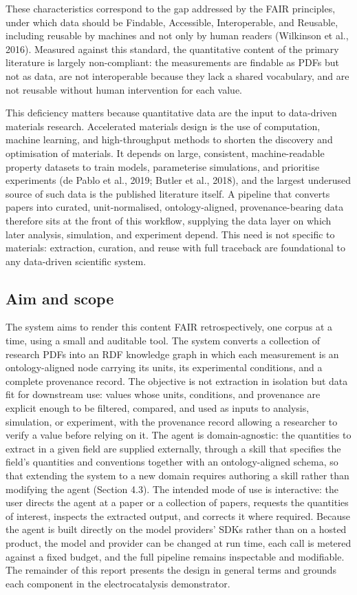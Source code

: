 \documentclass{template}
\begin{document}
These characteristics correspond to the gap addressed by the FAIR principles, under which data should be Findable, Accessible, Interoperable, and Reusable, including reusable by machines and not only by human readers (Wilkinson et al., 2016). Measured against this standard, the quantitative content of the primary literature is largely non-compliant: the measurements are findable as PDFs but not as data, are not interoperable because they lack a shared vocabulary, and are not reusable without human intervention for each value.

This deficiency matters because quantitative data are the input to data-driven materials research. Accelerated materials design is the use of computation, machine learning, and high-throughput methods to shorten the discovery and optimisation of materials. It depends on large, consistent, machine-readable property datasets to train models, parameterise simulations, and prioritise experiments (de Pablo et al., 2019; Butler et al., 2018), and the largest underused source of such data is the published literature itself. A pipeline that converts papers into curated, unit-normalised, ontology-aligned, provenance-bearing data therefore sits at the front of this workflow, supplying the data layer on which later analysis, simulation, and experiment depend. This need is not specific to materials: extraction, curation, and reuse with full traceback are foundational to any data-driven scientific system.

\subsection{Aim and scope}

The system aims to render this content FAIR retrospectively, one corpus at a time, using a small and auditable tool. The system converts a collection of research PDFs into an RDF knowledge graph in which each measurement is an ontology-aligned node carrying its units, its experimental conditions, and a complete provenance record. The objective is not extraction in isolation but data fit for downstream use: values whose units, conditions, and provenance are explicit enough to be filtered, compared, and used as inputs to analysis, simulation, or experiment, with the provenance record allowing a researcher to verify a value before relying on it. The agent is domain-agnostic: the quantities to extract in a given field are supplied externally, through a skill that specifies the field's quantities and conventions together with an ontology-aligned schema, so that extending the system to a new domain requires authoring a skill rather than modifying the agent (Section 4.3). The intended mode of use is interactive: the user directs the agent at a paper or a collection of papers, requests the quantities of interest, inspects the extracted output, and corrects it where required. Because the agent is built directly on the model providers' SDKs rather than on a hosted product, the model and provider can be changed at run time, each call is metered against a fixed budget, and the full pipeline remains inspectable and modifiable. The remainder of this report presents the design in general terms and grounds each component in the electrocatalysis demonstrator.
\end{document}
